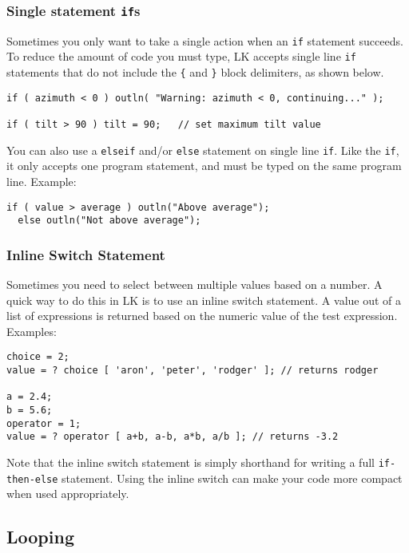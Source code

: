 \documentclass{article}
\begin{document}
\subsubsection{Single statement \texttt{if}s}
Sometimes you only want to take a single action when an \texttt{if} statement succeeds.  To reduce the amount of code you must type, LK accepts single line \texttt{if} statements that do not include the \texttt{\{} and \texttt{\}} block delimiters, as shown below.

\begin{verbatim}
if ( azimuth < 0 ) outln( "Warning: azimuth < 0, continuing..." );

if ( tilt > 90 ) tilt = 90;   // set maximum tilt value
\end{verbatim}

You can also use a \texttt{elseif} and/or \texttt{else} statement on single line \texttt{if}.  Like the \texttt{if}, it only accepts one program statement, and must be typed on the same program line.  Example:

\begin{verbatim}
if ( value > average ) outln("Above average");
  else outln("Not above average");
\end{verbatim}

\subsubsection{Inline Switch Statement}

Sometimes you need to select between multiple values based on a number.  A quick way to do this in LK is to use an inline switch statement.  A value out of a list of expressions is returned based on the numeric value of the test expression.  Examples:

\begin{verbatim}
choice = 2;
value = ? choice [ 'aron', 'peter', 'rodger' ]; // returns rodger

a = 2.4;
b = 5.6;
operator = 1;
value = ? operator [ a+b, a-b, a*b, a/b ]; // returns -3.2
\end{verbatim}

Note that the inline switch statement is simply shorthand for writing a full \texttt{if-then-else} statement.  Using the inline switch can make your code more compact when used appropriately.

\subsection{Looping}
\end{document}
